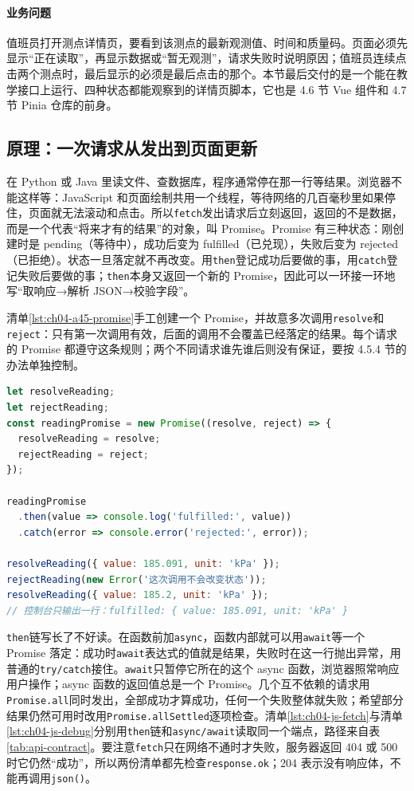 \paragraph{业务问题}值班员打开测点详情页，要看到该测点的最新观测值、时间和质量码。页面必须先显示“正在读取”，再显示数据或“暂无观测”，请求失败时说明原因；值班员连续点击两个测点时，最后显示的必须是最后点击的那个。本节最后交付的是一个能在教学接口上运行、四种状态都能观察到的详情页脚本，它也是 4.6 节 Vue 组件和 4.7 节 Pinia 仓库的前身。

\subsection{原理：一次请求从发出到页面更新}

在 Python 或 Java 里读文件、查数据库，程序通常停在那一行等结果。浏览器不能这样等：JavaScript 和页面绘制共用一个线程，等待网络的几百毫秒里如果停住，页面就无法滚动和点击。所以\texttt{fetch}发出请求后立刻返回，返回的不是数据，而是一个代表“将来才有的结果”的对象，叫 Promise。Promise 有三种状态：刚创建时是 pending（等待中），成功后变为 fulfilled（已兑现），失败后变为 rejected（已拒绝）。状态一旦落定就不再改变。用\texttt{then}登记成功后要做的事，用\texttt{catch}登记失败后要做的事；\texttt{then}本身又返回一个新的 Promise，因此可以一环接一环地写“取响应→解析 JSON→校验字段”。

清单\ref{lst:ch04-a45-promise}手工创建一个 Promise，并故意多次调用\texttt{resolve}和\texttt{reject}：只有第一次调用有效，后面的调用不会覆盖已经落定的结果。每个请求的 Promise 都遵守这条规则；两个不同请求谁先谁后则没有保证，要按 4.5.4 节的办法单独控制。

\begin{lstlisting}[label={lst:ch04-a45-promise},language=JavaScript,caption={Promise 状态一经落定不可再变}]
let resolveReading;
let rejectReading;
const readingPromise = new Promise((resolve, reject) => {
  resolveReading = resolve;
  rejectReading = reject;
});

readingPromise
  .then(value => console.log('fulfilled:', value))
  .catch(error => console.error('rejected:', error));

resolveReading({ value: 185.091, unit: 'kPa' });
rejectReading(new Error('这次调用不会改变状态'));
resolveReading({ value: 185.2, unit: 'kPa' });
// 控制台只输出一行：fulfilled: { value: 185.091, unit: 'kPa' }
\end{lstlisting}

\texttt{then}链写长了不好读。在函数前加\texttt{async}，函数内部就可以用\texttt{await}等一个 Promise 落定：成功时\texttt{await}表达式的值就是结果，失败时在这一行抛出异常，用普通的\texttt{try/catch}接住。\texttt{await}只暂停它所在的这个 async 函数，浏览器照常响应用户操作；async 函数的返回值总是一个 Promise。几个互不依赖的请求用\texttt{Promise.all}同时发出，全部成功才算成功，任何一个失败整体就失败；希望部分结果仍然可用时改用\texttt{Promise.allSettled}逐项检查。清单\ref{lst:ch04-js-fetch}与清单\ref{lst:ch04-js-debug}分别用\texttt{then}链和\texttt{async/await}读取同一个端点，路径来自表\ref{tab:api-contract}。要注意\texttt{fetch}只在网络不通时才失败，服务器返回 404 或 500 时它仍然“成功”，所以两份清单都先检查\texttt{response.ok}；204 表示没有响应体，不能再调用\texttt{json()}。

